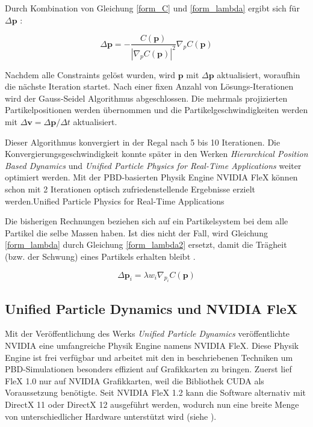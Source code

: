 Durch Kombination von Gleichung \ref{form_C} und \ref{form_lambda} ergibt sich für $\Delta \textbf{p}$ \cite{PBD}:

\begin{equation}
\Delta \textbf{p} = - \frac{C(\textbf{p})}{|\nabla_p C(\textbf{p})|^2} \nabla_p C(\textbf{p}) 
\label{form_db}
\end{equation}

Nachdem alle Constraints gelöst wurden, wird $\textbf{p}$ mit $\Delta \textbf{p}$ aktualisiert, woraufhin die nächste Iteration startet. Nach einer fixen Anzahl von Lösungs-Iterationen wird der Gauss-Seidel Algorithmus abgeschlossen. Die mehrmals projizierten Partikelpositionen werden übernommen und die Partikelgeschwindigkeiten werden mit $\Delta \textbf{v} = \Delta \textbf{p} / \Delta t$ aktualisiert.

Dieser Algorithmus konvergiert in der Regal nach 5 bis 10 Iterationen. Die Konvergierungsgeschwindigkeit konnte später in den Werken \textit{Hierarchical Position Based Dynamics} \cite{Mller2008HierarchicalPB} und \textit{Unified Particle Physics for Real-Time Applications} \cite{UPP} weiter optimiert werden. Mit der PBD-basierten Physik Engine NVIDIA FleX können schon mit 2 Iterationen optisch zufriedenstellende Ergebnisse erzielt werden.Unified Particle Physics for Real-Time Applications

Die bisherigen Rechnungen beziehen sich auf ein Partikelsystem bei dem alle Partikel die selbe Massen haben. Ist dies nicht der Fall, wird Gleichung \ref{form_lambda} durch Gleichung \ref{form_lambda2} ersetzt, damit die Trägheit (bzw. der Schwung) eines Partikels erhalten bleibt \cite{PBD}.

\begin{equation}
\Delta \textbf{p}_i = \lambda w_i \nabla_{p_i} C(\textbf{p})
\label{form_lambda2}
\end{equation}

\subsection{Unified Particle Dynamics und NVIDIA FleX}

Mit der Veröffentlichung des Werks \textit{Unified Particle Dynamics} \cite{UPP} veröffentlichte NVIDIA eine umfangreiche Physik Engine namens NVIDIA FleX.  Diese Physik Engine ist frei verfügbar und arbeitet mit den in \cite{UPP} beschriebenen Techniken um PBD-Simulationen besonders effizient auf Grafikkarten zu bringen.
Zuerst lief FleX 1.0 nur auf NVIDIA Grafikkarten, weil die Bibliothek CUDA als Voraussetzung benötigte. Seit NVIDIA FleX 1.2 kann die Software alternativ mit DirectX 11 oder DirectX 12 ausgeführt werden, wodurch nun eine breite Menge von unterschiedlicher Hardware unterstützt wird (siehe \cite{FlexD3D}).

